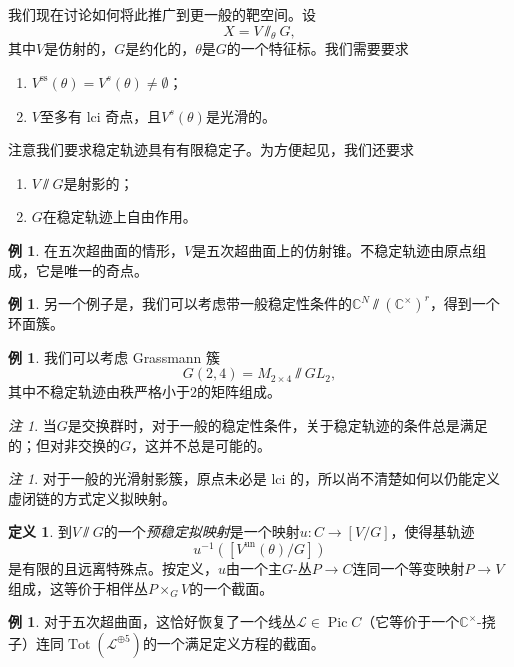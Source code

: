 \documentclass{amsart}
\theoremstyle{definition}
\newtheorem{defn}[thm]{定义}
\newtheorem{exm}[thm]{例}
\theoremstyle{remark}
\newtheorem{rmk}[thm]{注}
\theoremstyle{plain}
\theoremstyle{definition}
\theoremstyle{remark}
\newcommand{\C}{\mathbb{C}}
\newcommand{\mc}[1]{\mathcal{#1}}
\newcommand{\mr}[1]{\mathrm{#1}}
\newcommand{\on}[1]{\operatorname{#1}}
\newcommand{\1}{\mathbf{1}}
\newcommand{\2}{\mathbf{2}}
\newcommand{\3}{\mathbf{3}}
\DeclareMathOperator{\Pic}{Pic}
\begin{document}
我们现在讨论如何将此推广到更一般的靶空间。设
\[ X = V \sslash_{\theta} G, \]
其中\(V\)是仿射的，\(G\)是约化的，\(\theta\)是\(G\)的一个特征标。我们需要要求
\begin{enumerate}
    \item \(V^{\mr{ss}}(\theta) = V^s(\theta) \neq \emptyset\)；
    \item \(V\)至多有 lci 奇点，且\(V^s(\theta)\)是光滑的。
\end{enumerate}
注意我们要求稳定轨迹具有有限稳定子。为方便起见，我们还要求
\begin{enumerate}
    \item \(V \sslash G\)是射影的；
    \item \(G\)在稳定轨迹上自由作用。
\end{enumerate}

\begin{exm}
    在五次超曲面的情形，\(V\)是五次超曲面上的仿射锥。不稳定轨迹由原点组成，它是唯一的奇点。
\end{exm}

\begin{exm}
    另一个例子是，我们可以考虑带一般稳定性条件的\(\C^N \sslash (\C^{\times})^r\)，得到一个环面簇。
\end{exm}

\begin{exm}
    我们可以考虑 Grassmann 簇
    \[ G(2,4) = M_{2\times 4} \sslash GL_2, \]
    其中不稳定轨迹由秩严格小于\(2\)的矩阵组成。
\end{exm}

\begin{rmk}
    当\(G\)是交换群时，对于一般的稳定性条件，关于稳定轨迹的条件总是满足的；但对非交换的\(G\)，这并不总是可能的。
\end{rmk}

\begin{rmk}
    对于一般的光滑射影簇，原点未必是 lci 的，所以尚不清楚如何以仍能定义虚闭链的方式定义拟映射。
\end{rmk}

\begin{defn}
    到\(V \sslash G\)的一个\textit{预稳定拟映射}是一个映射\(u \colon C \to [V/G]\)，使得基轨迹
    \[ u^{-1}([V^{\mr{un}}(\theta) / G]) \]
    是有限的且远离特殊点。按定义，\(u\)由一个主\(G\)-丛\(P \to C\)连同一个等变映射\(P \to V\)组成，这等价于相伴丛\(P \times_G V\)的一个截面。
\end{defn}

\begin{exm}
    对于五次超曲面，这恰好恢复了一个线丛\(\mc{L} \in \Pic C\)（它等价于一个\(\C^{\times}\)-挠子）连同\(\on{Tot}(\mc{L}^{\oplus 5})\)的一个满足定义方程的截面。
\end{exm}
\end{document}
